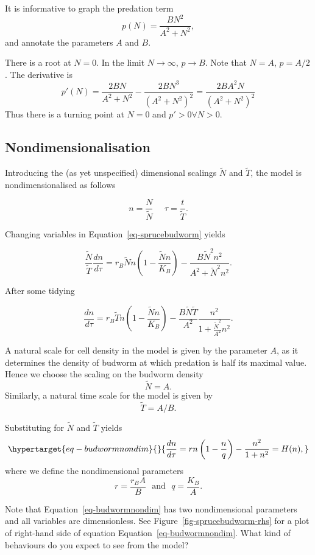 \documentclass[
  letterpaper,
  DIV=11,
  numbers=noendperiod]{scrreprt}
\begin{document}
It is informative to graph the predation term \[
p(N) =\frac{B N^2}{A^2 +N^2},
\] and annotate the parameters \(A\) and \(B\).

There is a root at \(N=0\). In the limit \(N\rightarrow \infty\),
\(p \rightarrow B\). Note that \(N=A\), \(p=A/2\). The derivative is \[
p'(N)=\frac{2BN}{A^2+N^2} - \frac{2BN^3}{(A^2+N^2)^2} =  \frac{2BA^2N}{(A^2+N^2)^2}
\] Thus there is a turning point at \(N=0\) and \(p'>0 \forall N>0\).

\hypertarget{nondimensionalisation-1}{%
\subsection{Nondimensionalisation}\label{nondimensionalisation-1}}

Introducing the (as yet unspecified) dimensional scalings \(\tilde{N}\)
and \(\tilde{T}\), the model is nondimensionalised as follows

\[
n=\frac{N}{\tilde{N}} \ \ \ \ \ \ \tau=\frac{t}{\tilde{T}}.
\]

Changing variables in Equation~\ref{eq-sprucebudworm} yields

\[
\frac{\tilde{N}}{\tilde{T}}\frac{d n }{d\tau}= r_B \tilde{N}n\left(1-\frac{\tilde{N}n}{K_B}\right)-\frac{B\tilde{N}^2n^2}{A^2+\tilde{N}^2 n^2}.
\]

After some tidying

\[
\frac{dn }{d\tau}= r_B\tilde{T} n\left(1-\frac{\tilde{N}n}{K_B}\right)-\frac{B\tilde{N} \tilde{T}}{A^2}\frac{n^2}{1+\frac{\tilde{N}^2}{A^2}n^2}.
\]

A natural scale for cell density in the model is given by the parameter
\(A\), as it determines the density of budworm at which predation is
half its maximal value. Hence we choose the scaling on the budworm
density \[
\tilde{N}=A.
\] Similarly, a natural time scale for the model is given by\\
\[
\tilde{T}=A/B.
\]

Substituting for \(\tilde{N}\) and \(\tilde{T}\) yields
\begin{equation}\protect\hypertarget{eq-budwormnondim}{}{
\frac{dn }{d\tau}= rn\left(1-\frac{n}{q}\right)-\frac{n^2}{1+n^2} = H(n),
}\label{eq-budwormnondim}\end{equation} where we define the
nondimensional parameters \[
r= \frac{r_B A}{B} \ \ \  \textrm{and} \ \ \  q=\frac{K_B}{A}.
\]

Note that Equation~\ref{eq-budwormnondim} has two nondimensional
parameters and all variables are dimensionless. See
Figure~\ref{fig-sprucebudworm-rhs} for a plot of right-hand side of
equation Equation~\ref{eq-budwormnondim}. What kind of behaviours do you
expect to see from the model?
\end{document}
